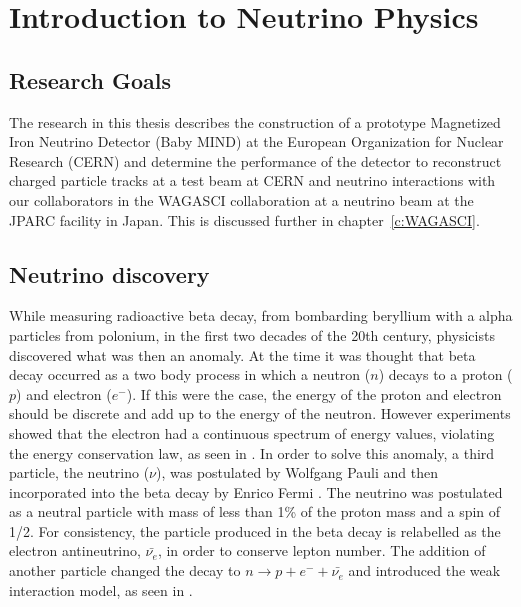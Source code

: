 \chapter{Introduction to Neutrino Physics}
\label{c:theoryIntro}

\section{Research Goals}
The research in this thesis describes the construction of a prototype Magnetized Iron Neutrino Detector (Baby MIND) at the European Organization for Nuclear Research (CERN) and determine the performance of the detector to reconstruct charged particle tracks at a test beam at CERN and neutrino interactions with our collaborators in the WAGASCI collaboration at a neutrino beam at the JPARC facility in Japan. This is discussed further in chapter~\ref{c:WAGASCI}.


\section{Neutrino discovery}\label{section:Theory}
While measuring radioactive beta decay, from bombarding beryllium with a alpha particles from polonium, in the first two decades of the 20th century, physicists discovered what was then an anomaly. At the time it was thought that beta decay occurred as a two body process in which a neutron ($n$) decays to a proton ($p$) and electron ($e^-$). If this were the case, the energy of the proton and electron should be discrete and add up to the energy of the neutron. However experiments showed that the electron had a continuous spectrum of energy values, violating the energy conservation law, as seen in . In order to solve this anomaly, a third particle, the neutrino ($\nu$), was postulated by Wolfgang Pauli \cite{4Pauli:Online} and then incorporated into the beta decay by Enrico Fermi \cite{5Wilson}. The neutrino was postulated as a neutral particle with mass of less than 1\% of the proton mass and a spin of 1/2. For consistency, the particle produced in the beta decay is relabelled as the electron antineutrino, $\bar{\nu_e}$, in order to conserve lepton number. The addition of another particle changed the decay to $n \rightarrow p + e^- + \bar{\nu_e}$ and introduced the weak interaction model, as seen in . 

